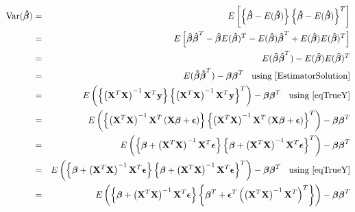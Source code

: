 \documentclass[11pt]{article}
\theoremstyle{remark}
\begin{document}
\begin{eqnarray}
\text{Var}(\boldsymbol{\hat{\beta}}) &=& E\left[ \left\{  \boldsymbol{\hat{\beta}}-E(\boldsymbol{\hat{\beta}})  \right\} \left\{  \boldsymbol{\hat{\beta}}-E(\boldsymbol{\hat{\beta}})  \right\}^T \right]\nonumber\\
&=& E\left[\boldsymbol{\hat{\beta}}\boldsymbol{\hat{\beta}}^T - \boldsymbol{\hat{\beta}}E(\boldsymbol{\hat{\beta}})^T  - E(\boldsymbol{\hat{\beta}})\boldsymbol{\hat{\beta}}^T + E(\boldsymbol{\hat{\beta}})E(\boldsymbol{\hat{\beta}})^T\right]\nonumber\\
&=& E(\boldsymbol{\hat{\beta}}\boldsymbol{\hat{\beta}}^T) - E(\boldsymbol{\hat{\beta}})E(\boldsymbol{\hat{\beta}})^T\nonumber\\
&=& E(\boldsymbol{\hat{\beta}}\boldsymbol{\hat{\beta}}^T) - \boldsymbol{\beta}\boldsymbol{\beta}^T\:\:\:\:\text{using \eqref{EstimatorSolution}}\nonumber\\
&=& E\left(\left\{\left(\mathbf{X}^T\mathbf{X}\right)^{-1}\mathbf{X}^T\mathbf{y}\right\}\left\{\left(\mathbf{X}^T\mathbf{X}\right)^{-1}\mathbf{X}^T\mathbf{y}\right\}^T\right) - \boldsymbol{\beta}\boldsymbol{\beta}^T\:\:\:\:\text{using \eqref{eqTrueY}}\nonumber\\
&=& E\left(\left\{\left(\mathbf{X}^T\mathbf{X}\right)^{-1}\mathbf{X}^T\left(\mathbf{X}\boldsymbol{\beta} + \boldsymbol{\epsilon}\right)\right\}\left\{\left(\mathbf{X}^T\mathbf{X}\right)^{-1}\mathbf{X}^T\left(\mathbf{X}\boldsymbol{\beta} + \boldsymbol{\epsilon}\right)\right\}^T\right) - \boldsymbol{\beta}\boldsymbol{\beta}^T\nonumber\\
&=& E\left(\left\{\boldsymbol{\beta} + \left(\mathbf{X}^T\mathbf{X}\right)^{-1}\mathbf{X}^T\boldsymbol{\epsilon}\right\}\left\{\boldsymbol{\beta} + \left(\mathbf{X}^T\mathbf{X}\right)^{-1}\mathbf{X}^T\boldsymbol{\epsilon}\right\}^T\right) - \boldsymbol{\beta}\boldsymbol{\beta}^T\nonumber\\
&=& E\left(\left\{\boldsymbol{\beta} + \left(\mathbf{X}^T\mathbf{X}\right)^{-1}\mathbf{X}^T\boldsymbol{\epsilon}\right\}\left\{\boldsymbol{\beta} + \left(\mathbf{X}^T\mathbf{X}\right)^{-1}\mathbf{X}^T\boldsymbol{\epsilon}\right\}^T\right) - \boldsymbol{\beta}\boldsymbol{\beta}^T\:\:\:\:\text{using \eqref{eqTrueY}}\nonumber\\
&=& E\left(\left\{\boldsymbol{\beta} + \left(\mathbf{X}^T\mathbf{X}\right)^{-1}\mathbf{X}^T\boldsymbol{\epsilon}\right\}\left\{\boldsymbol{\beta}^T + \boldsymbol{\epsilon}^T\left(\left(\mathbf{X}^T\mathbf{X}\right)^{-1}\mathbf{X}^T\right)^T\right\}\right) - \boldsymbol{\beta}\boldsymbol{\beta}^T\nonumber\\

\end{eqnarray}
\end{document}
